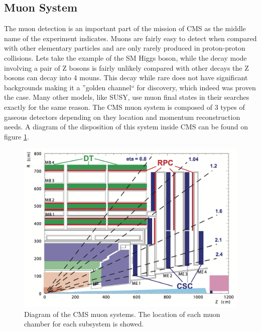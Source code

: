 

\subsection{Muon System}
\label{SUBSECTION:ExperimentalApparatus_CMS_Moun}


The muon detection is an important part of the mission of \gls{CMS} as the middle name of the experiment indicates. Muons are fairly easy to detect when compared with other elementary particles and are only rarely produced in proton-proton collisions. Lets take the example of the \gls{SM} Higgs boson, while the decay mode involving a pair of Z bosons is fairly unlikely compared with other decays the Z bosons can decay into 4 mouns. This decay while rare does not have significant backgrounds making it a ''golden channel`` for discovery, which indeed was proven the case\cite{ARTICLE:CMSHiggsObservation}. Many other models, like SUSY, use muon final states in their searches exactly for the same reason. The \gls{CMS} muon system is composed of 3 types of gaseous detectors depending on they location and momentum reconstruction needs. A diagram of the disposition of this system inside \gls{CMS} can be found on figure \ref{FIGURE:ExperimentalApparatus_CMS_Muon_Layout}.

\begin{figure}[!htb]
  \centering
  \includegraphics{Chapter02/CMS/Images/CMS_Muon_Layout.png}
  \caption{Diagram of the \gls{CMS} muon systems. The location of each muon chamber for each subsystem is showed.}
  \label{FIGURE:ExperimentalApparatus_CMS_Muon_Layout}
\end{figure}

